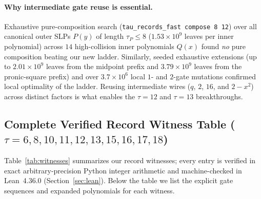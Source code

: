 \documentclass[11pt]{article}
\newcommand{\code}[1]{\texttt{#1}}
\begin{document}
\paragraph{Why intermediate gate reuse is essential.}
Exhaustive pure-composition search (\code{tau\_records\_fast compose 8 12}) over all canonical outer SLPs $P(y)$ of length $\tau_P \le 8$ ($1.53 \times 10^9$ leaves per inner polynomial) across $14$ high-collision inner polynomials $Q(x)$ found \emph{no} pure composition beating our new ladder. Similarly, seeded exhaustive extensions (up to $2.01 \times 10^9$ leaves from the midpoint prefix and $3.79 \times 10^9$ leaves from the pronic-square prefix) and over $3.7 \times 10^6$ local $1$- and $2$-gate mutations confirmed local optimality of the ladder. Reusing intermediate wires ($q$, $2$, $16$, and $2 - x^2$) across distinct factors is what enables the $\tau = 12$ and $\tau = 13$ breakthroughs.

\subsection{Complete Verified Record Witness Table ($\tau = 6, 8, 10, 11, 12, 13, 15, 16, 17, 18$)}
Table~\ref{tab:witnesses} summarizes our record witnesses; every entry is verified in exact arbitrary-precision Python integer arithmetic and machine-checked in Lean~4.36.0 (Section~\ref{sec:lean}). Below the table we list the explicit gate sequences and expanded polynomials for each witness.
\end{document}
